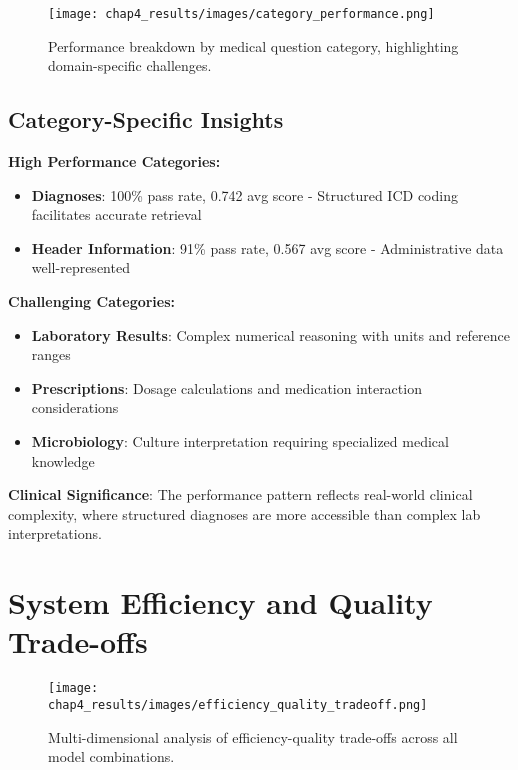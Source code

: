 

\begin{figure}[!htbp]
    \centering
    \texttt{[image: chap4\_results/images/category\_performance.png]}
    \caption{Performance breakdown by medical question category, highlighting domain-specific challenges.}
    \label{fig:category_performance}
\end{figure}

\subsection{Category-Specific Insights}

\textbf{High Performance Categories:}
\begin{itemize}
    \item \textbf{Diagnoses}: 100\% pass rate, 0.742 avg score - Structured ICD coding facilitates accurate retrieval
    \item \textbf{Header Information}: 91\% pass rate, 0.567 avg score - Administrative data well-represented
\end{itemize}

\textbf{Challenging Categories:}
\begin{itemize}
    \item \textbf{Laboratory Results}: Complex numerical reasoning with units and reference ranges
    \item \textbf{Prescriptions}: Dosage calculations and medication interaction considerations
    \item \textbf{Microbiology}: Culture interpretation requiring specialized medical knowledge
\end{itemize}

\textbf{Clinical Significance}: The performance pattern reflects real-world clinical complexity, where structured diagnoses are more accessible than complex lab interpretations.

\section{System Efficiency and Quality Trade-offs}

\begin{figure}[!htbp]
    \centering
    \texttt{[image: chap4\_results/images/efficiency\_quality\_tradeoff.png]}
    \caption{Multi-dimensional analysis of efficiency-quality trade-offs across all model combinations.}
    \label{fig:efficiency_quality}
\end{figure}

